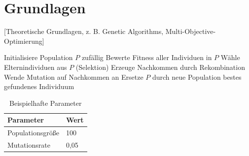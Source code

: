 \section{Grundlagen}

[Theoretische Grundlagen, z. B. Genetic Algorithms, Multi-Objective-Optimierung]

\begin{algorithm}
  \caption{Beispielhafter Ablauf eines genetischen Algorithmus}
  \label{alg:ga-example}
  \begin{algorithmic}[1]
    \State Initialisiere Population $P$ zufällig
      \State Bewerte Fitness aller Individuen in $P$
      \State Wähle Elternindividuen aus $P$ (Selektion)
      \State Erzeuge Nachkommen durch Rekombination
      \State Wende Mutation auf Nachkommen an
      \State Ersetze $P$ durch neue Population
    \EndWhile
    \State \Return bestes gefundenes Individuum
  \end{algorithmic}
\end{algorithm}

\begin{table}[htbp]
  \centering
  \caption{Beispielhafte Parameter}
  \label{tab:parameter-beispiel}
  \begin{tabular}{ll}
    \toprule
    Parameter & Wert \\
    \midrule
    Populationsgröße & 100 \\
    Mutationsrate & 0{,}05 \\
    \bottomrule
  \end{tabular}
\end{table}

